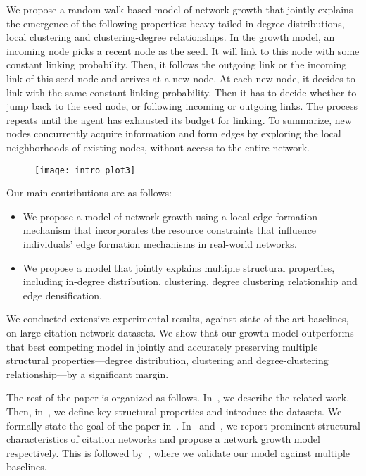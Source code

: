 We propose a random walk based model of network growth that jointly explains the
emergence of the following properties: heavy-tailed in-degree distributions,
local clustering and clustering-degree relationships. In the growth model, an
incoming node picks a recent node as the seed. It will link to this node with
some constant linking probability. Then, it follows the outgoing link or the
incoming link of this seed node and arrives at a new node. At each new node, it
decides to link with the same constant linking probability. Then it has to
decide whether to jump back to the seed node, or following incoming or outgoing
links. The process repeats until the agent has exhausted its budget for linking.
To summarize, new nodes concurrently acquire information and form edges
by exploring the local neighborhoods of existing nodes, without access to the
entire network.

\begin{figure}[t]
 \centering
 \texttt{[image: intro\_plot3]}
 \caption{
 }
 \label{fig:intro_plot}
\end{figure}


Our main contributions are as follows:
\begin{itemize}
    \item We propose a model
    of network growth using a local edge formation mechanism that incorporates the
    resource constraints that influence individuals' edge formation mechanisms in
    real-world networks.
    \item We propose a model that jointly explains multiple
    structural properties, including in-degree distribution, clustering, degree
    clustering relationship and edge densification.
\end{itemize}


We conducted extensive experimental results, against state of the art
baselines, on large citation network datasets. We show that our growth model
outperforms that best competing model in jointly and accurately preserving
multiple structural properties---degree distribution, clustering and
degree-clustering relationship---by a significant margin.

The rest of the paper is organized as follows. In~, we
describe the related work. Then, in~, we define key
structural properties and introduce the datasets. We formally state the goal of
the paper in~. In~
and~, we report prominent structural characteristics
of citation networks and propose a network growth model respectively. This is
followed by~, where we validate our model against
multiple baselines.


